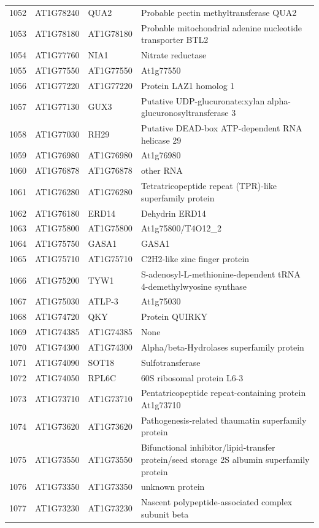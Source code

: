 \documentclass[11pt]{article}
\begin{document}
\begin{center}
\begin{tabular}{rlll}
1052 & AT1G78240 & QUA2 & Probable pectin methyltransferase QUA2\\
1053 & AT1G78180 & AT1G78180 & Probable mitochondrial adenine nucleotide transporter BTL2\\
1054 & AT1G77760 & NIA1 & Nitrate reductase\\
1055 & AT1G77550 & AT1G77550 & At1g77550\\
1056 & AT1G77220 & AT1G77220 & Protein LAZ1 homolog 1\\
1057 & AT1G77130 & GUX3 & Putative UDP-glucuronate:xylan alpha-glucuronosyltransferase 3\\
1058 & AT1G77030 & RH29 & Putative DEAD-box ATP-dependent RNA helicase 29\\
1059 & AT1G76980 & AT1G76980 & At1g76980\\
1060 & AT1G76878 & AT1G76878 & other RNA\\
1061 & AT1G76280 & AT1G76280 & Tetratricopeptide repeat (TPR)-like superfamily protein\\
1062 & AT1G76180 & ERD14 & Dehydrin ERD14\\
1063 & AT1G75800 & AT1G75800 & At1g75800/T4O12\_2\\
1064 & AT1G75750 & GASA1 & GASA1\\
1065 & AT1G75710 & AT1G75710 & C2H2-like zinc finger protein\\
1066 & AT1G75200 & TYW1 & S-adenosyl-L-methionine-dependent tRNA 4-demethylwyosine synthase\\
1067 & AT1G75030 & ATLP-3 & At1g75030\\
1068 & AT1G74720 & QKY & Protein QUIRKY\\
1069 & AT1G74385 & AT1G74385 & None\\
1070 & AT1G74300 & AT1G74300 & Alpha/beta-Hydrolases superfamily protein\\
1071 & AT1G74090 & SOT18 & Sulfotransferase\\
1072 & AT1G74050 & RPL6C & 60S ribosomal protein L6-3\\
1073 & AT1G73710 & AT1G73710 & Pentatricopeptide repeat-containing protein At1g73710\\
1074 & AT1G73620 & AT1G73620 & Pathogenesis-related thaumatin superfamily protein\\
1075 & AT1G73550 & AT1G73550 & Bifunctional inhibitor/lipid-transfer protein/seed storage 2S albumin superfamily protein\\
1076 & AT1G73350 & AT1G73350 & unknown protein\\
1077 & AT1G73230 & AT1G73230 & Nascent polypeptide-associated complex subunit beta\\

\end{tabular}
\end{center}
\end{document}
